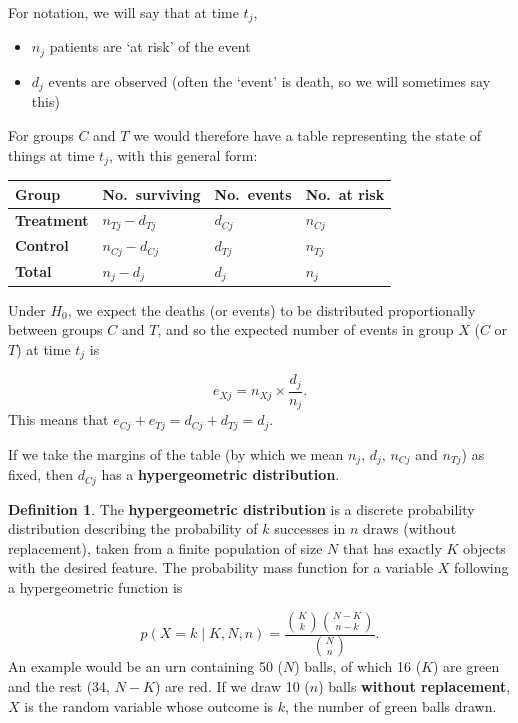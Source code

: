 \documentclass[
  openany]{book}
\providecommand{\tightlist}{%
  \setlength{\itemsep}{0pt}\setlength{\parskip}{0pt}}
\theoremstyle{definition}
\newtheorem{definition}{Definition}[chapter]
\theoremstyle{definition}
\theoremstyle{definition}
\theoremstyle{definition}
\theoremstyle{remark}
\begin{document}
For notation, we will say that at time \(t_j\),

\begin{itemize}
\tightlist
\item
  \(n_j\) patients are `at risk' of the event
\item
  \(d_j\) events are observed (often the `event' is death, so we will sometimes say this)
\end{itemize}

For groups \(C\) and \(T\) we would therefore have a table representing the state of things at time \(t_j\), with this general form:

\begin{longtable}[]{@{}llll@{}}
\toprule\noalign{}
Group & No.~surviving & No.~events & No.~at risk \\
\midrule\noalign{}
\endhead
\bottomrule\noalign{}
\endlastfoot
\textbf{Treatment} & \(n_{Tj}-d_{Tj}\) & \(d_{Cj}\) & \(n_{Cj}\) \\
\textbf{Control} & \(n_{Cj}-d_{Cj}\) & \(d_{Tj}\) & \(n_{Tj}\) \\
\textbf{Total} & \(n_j-d_j\) & \(d_j\) & \(n_j\) \\
\end{longtable}

Under \(H_0\), we expect the deaths (or events) to be distributed proportionally between groups \(C\) and \(T\), and so the expected number of events in group \(X\) (\(C\) or \(T\)) at time \(t_j\) is

\[e_{Xj} = n_{Xj}\times{\frac{d_j}{n_j}}.\]
This means that \(e_{Cj}+e_{Tj} = d_{Cj} + d_{Tj} = d_j\).

If we take the margins of the table (by which we mean \(n_j, \,d_j,\,n_{Cj}\) and \(n_{Tj}\)) as fixed, then \(d_{Cj}\) has a \textbf{hypergeometric distribution}.

\begin{definition}
The \textbf{hypergeometric distribution} is a discrete probability distribution describing the probability of \(k\) successes in \(n\) draws (without replacement), taken from a finite population of size \(N\) that has exactly \(K\) objects with the desired feature. The probability mass function for a variable \(X\) following a hypergeometric function is

\[p\left(X=k\mid{K,N,n}\right) = \frac{{\binom{K}{k}}{\binom{N-K}{n-k}}}{{\binom{N}{n}}}. \]
An example would be an urn containing 50 (\(N\)) balls, of which 16 (\(K\)) are green and the rest (34, \(N-K\)) are red. If we draw 10 (\(n\)) balls \textbf{without replacement}, \(X\) is the random variable whose outcome is \(k\), the number of green balls drawn.
\end{definition}
\end{document}
